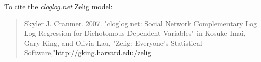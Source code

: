 To cite the \emph{ cloglog.net } Zelig model:
 \begin{verse}
 Skyler J. Cranmer. 2007. "cloglog.net: Social Network Complementary Log Log Regression for Dichotomous Dependent Variables" in Kosuke Imai, Gary King, and Olivia Lau, "Zelig: Everyone's Statistical Software,"\url{http://gking.harvard.edu/zelig} 
\end{verse}